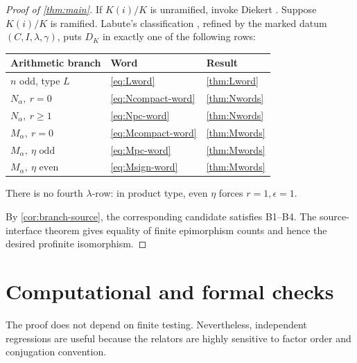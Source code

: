 \documentclass[11pt,reqno]{amsart}
\theoremstyle{definition}
\theoremstyle{remark}
\numberwithin{equation}{section}
\begin{document}
\begin{proof}[Proof of \cref{thm:main}]
If \(K(i)/K\) is unramified, invoke Diekert
\cite{Diekert1984}.  Suppose \(K(i)/K\) is ramified.  Labute's
classification \cite{Labute1967}, refined by the marked datum
\((C,I,\lambda,\gamma)\), puts \(D_K\) in exactly one of the following
rows:
\begin{center}
\begin{tabular}{lll}
\toprule
Arithmetic branch & Word & Result\\
\midrule
\(n\) odd, type \(L\) & \eqref{eq:Lword} & \cref{thm:Lword}\\
\(N_\alpha,\ r=0\) & \eqref{eq:Ncompact-word} & \cref{thm:Nwords}\\
\(N_\alpha,\ r\ge1\) & \eqref{eq:Npc-word} & \cref{thm:Nwords}\\
\(M_\alpha,\ r=0\) & \eqref{eq:Mcompact-word} & \cref{thm:Mwords}\\
\(M_\alpha,\ \eta\text{ odd}\) & \eqref{eq:Mpc-word} & \cref{thm:Mwords}\\
\(M_\alpha,\ \eta\text{ even}\) & \eqref{eq:Msign-word} & \cref{thm:Mwords}\\
\bottomrule
\end{tabular}
\end{center}
There is no fourth \(\lambda\)-row: in product type, even \(\eta\)
forces \(r=1,\epsilon=1\).

By \cref{cor:branch-source}, the corresponding candidate satisfies
B1--B4.  The source-interface theorem gives equality of finite
epimorphism counts and hence the desired profinite isomorphism.
\end{proof}

\section{Computational and formal checks}\label{sec:checks}

The proof does not depend on finite testing.  Nevertheless, independent
regressions are useful because the relators are highly sensitive to
factor order and conjugation convention.
\end{document}
